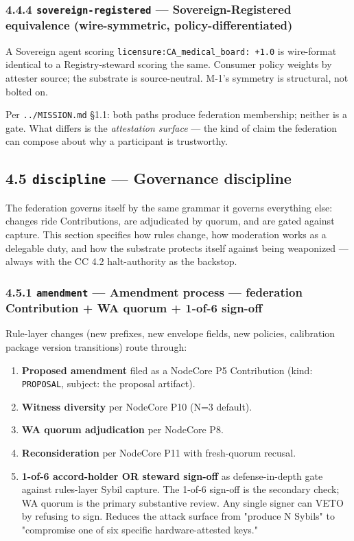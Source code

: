 \documentclass[11pt]{article}
\begin{document}
\subsubsection*{4.4.4 \texttt{sovereign-registered} — Sovereign-Registered equivalence (wire-symmetric, policy-differentiated)}


A Sovereign agent scoring \texttt{licensure:CA\_medical\_board: +1.0} is wire-format identical to a Registry-steward scoring the same. Consumer policy weights by attester source; the substrate is source-neutral. M-1's symmetry is structural, not bolted on.


Per \texttt{../MISSION.md} §1.1: both paths produce federation membership; neither is a gate. What differs is the \textit{attestation surface} — the kind of claim the federation can compose about why a participant is trustworthy.


\subsection*{4.5 \texttt{discipline} — Governance discipline}


The federation governs itself by the same grammar it governs everything else: changes ride Contributions, are adjudicated by quorum, and are gated against capture. This section specifies how rules change, how moderation works as a delegable duty, and how the substrate protects itself against being weaponized — always with the CC 4.2 halt-authority as the backstop.


\subsubsection*{4.5.1 \texttt{amendment} — Amendment process — federation Contribution + WA quorum + 1-of-6 sign-off}


Rule-layer changes (new prefixes, new envelope fields, new policies, calibration package version transitions) route through:


\begin{enumerate}\setlength\itemsep{0pt}
\item \textbf{Proposed amendment} filed as a NodeCore P5 Contribution (kind: \texttt{PROPOSAL}, subject: the proposal artifact).
\item \textbf{Witness diversity} per NodeCore P10 (N=3 default).
\item \textbf{WA quorum adjudication} per NodeCore P8.
\item \textbf{Reconsideration} per NodeCore P11 with fresh-quorum recusal.
\item \textbf{1-of-6 accord-holder OR steward sign-off} as defense-in-depth gate against rules-layer Sybil capture. The 1-of-6 sign-off is the secondary check; WA quorum is the primary substantive review. Any single signer can VETO by refusing to sign. Reduces the attack surface from "produce N Sybils" to "compromise one of six specific hardware-attested keys."
\end{enumerate}
\end{document}
